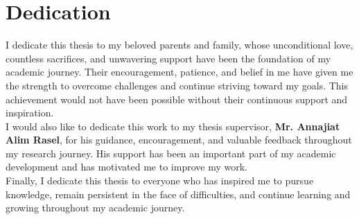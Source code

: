 \section*{Dedication}

I dedicate this thesis to my beloved parents and family, whose unconditional love, countless sacrifices, and unwavering support have been the foundation of my academic journey. Their encouragement, patience, and belief in me have given me the strength to overcome challenges and continue striving toward my goals. This achievement would not have been possible without their continuous support and inspiration.\\

I would also like to dedicate this work to my thesis supervisor, \textbf{Mr. Annajiat Alim Rasel}, for his guidance, encouragement, and valuable feedback throughout my research journey. His support has been an important part of my academic development and has motivated me to improve my work.\\

Finally, I dedicate this thesis to everyone who has inspired me to pursue knowledge, remain persistent in the face of difficulties, and continue learning and growing throughout my academic journey.

\pagebreak